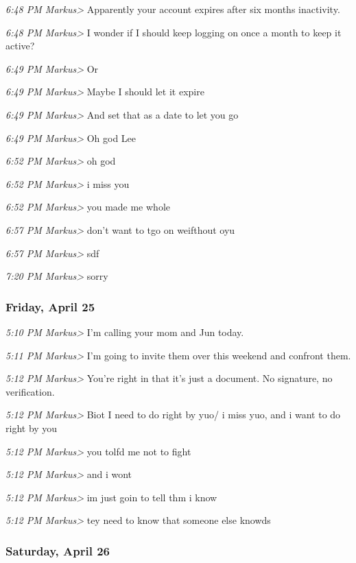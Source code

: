 {\emph{6:48 PM Markus\textgreater{}} Apparently your account expires
after six months inactivity.

\emph{6:48 PM Markus\textgreater{}} I wonder if I should keep logging on
once a month to keep it active?

\emph{6:49 PM Markus\textgreater{}} Or

\emph{6:49 PM Markus\textgreater{}} Maybe I should let it expire

\emph{6:49 PM Markus\textgreater{}} And set that as a date to let you go

\emph{6:49 PM Markus\textgreater{}} Oh god Lee

\emph{6:52 PM Markus\textgreater{}} oh god

\emph{6:52 PM Markus\textgreater{}} i miss you

\emph{6:52 PM Markus\textgreater{}} you made me whole

\emph{6:57 PM Markus\textgreater{}} don't want to tgo on weifthout oyu

\emph{6:57 PM Markus\textgreater{}} sdf

\emph{7:20 PM Markus\textgreater{}} sorry

\subsubsection*{Friday, April 25}\label{friday-april-25}

\emph{5:10 PM Markus\textgreater{}} I'm calling your mom and Jun today.

\emph{5:11 PM Markus\textgreater{}} I'm going to invite them over this
weekend and confront them.

\emph{5:12 PM Markus\textgreater{}} You're right in that it's just a
document. No signature, no verification.

\emph{5:12 PM Markus\textgreater{}} Biot I need to do right by yuo/ i
miss yuo, and i want to do right by you

\emph{5:12 PM Markus\textgreater{}} you tolfd me not to fight

\emph{5:12 PM Markus\textgreater{}} and i wont

\emph{5:12 PM Markus\textgreater{}} im just goin to tell thm i know

\emph{5:12 PM Markus\textgreater{}} tey need to know that someone else
knowds

\subsubsection*{Saturday, April 26}\label{saturday-april-26}

}
